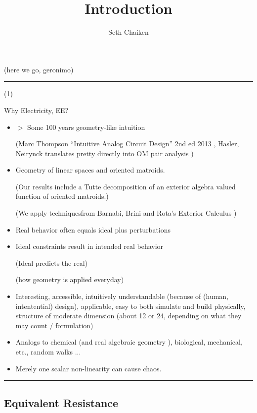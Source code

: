 \documentclass{article}
\title{Introduction}
\author{Seth Chaiken}
\begin{document}
\maketitle

(here we go, geronimo)


\rule{\textwidth}{3pt}
(1)








Why Electricity, EE?
\begin{itemize}
\item $>$ Some 100 years geometry-like intuition

(Marc Thompson ``Intuitive Analog Circuit Design'' 2nd ed 2013
\cite{intuitAna}, Hasler, Neirynck translates pretty directly into
OM pair analysis \cite{HaslerNeirynck})


\item Geometry of linear spaces and oriented matroids.

(Our results include a Tutte decomposition of an exterior algebra
valued function of oriented matroids.)

(We apply techniquesfrom Barnabi, Brini and Rota's Exterior Calculus 
\cite{exteriorCalc})

\item
Real behavior often equals ideal plus perturbations

\item
Ideal constraints result in intended real behavior

(Ideal predicts the real)

(how geometry is applied everyday)

\item 
Interesting, accessible, intuitively understandable
(because of (human, intentential) design), applicable,
easy to both simulate and build physically, structure of moderate
dimension (about 12 or 24, depending on what they may count / formulation)
\item
Analogs to chemical (and real algebraic geometry 
\cite{signsInChemRAG}), biological, mechanical, etc., random walks ...

\item
Merely one scalar non-linearity can cause chaos.
\end{itemize}
\rule{\textwidth}{3pt}

\subsection{Equivalent Resistance}
\end{document}

